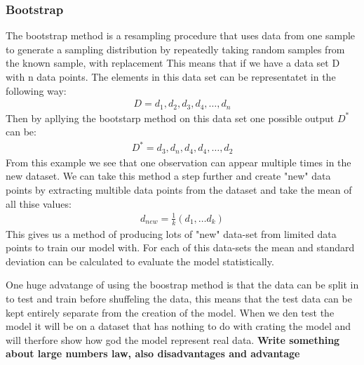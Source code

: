 \subsubsection{Bootstrap} 
\noindent The bootstrap method is a resampling procedure that uses data from one 
sample to generate a sampling distribution by repeatedly taking random 
samples from the known sample, with replacement %
This means that if we have a data set D with n data points.
The elements in this data set can be representatet in the following way:
\begin{align}
    D = {d_1, d_2, d_3, d_4, \dots, d_n}
\end{align}
Then by apllying the bootstarp method on this data set one possible output $D^{*}$ can be:
\begin{align}
    D^{*} = {d_3, d_n, d_4, d_4 , \dots, d_2}
\end{align}
From this example we see that one observation can appear multiple times in the new dataset.
We can take this method a step further and create "new" data points by extracting multible data points from 
the dataset and take the mean of all thise values:
\begin{align}
    d_{new} = \frac{1}{k}(d_1, \dots d_k)
\end{align}
This gives us a method of producing lots of "new" data-set from 
limited data points to train our model with. For each of this data-sets
the mean and standard deviation can be calculated to evaluate the model statistically. \cite{MLM}


One huge advatange of using the boostrap method is that the data can be split in to 
test and train before shuffeling the data, this means that the test data can be kept 
entirely separate from the creation of the model. When we den test the model it will
be on a dataset that has nothing to do with crating the model and will therfore show
how god the model represent real data. 
\textbf{Write something about large numbers law, also disadvantages and advantage}


